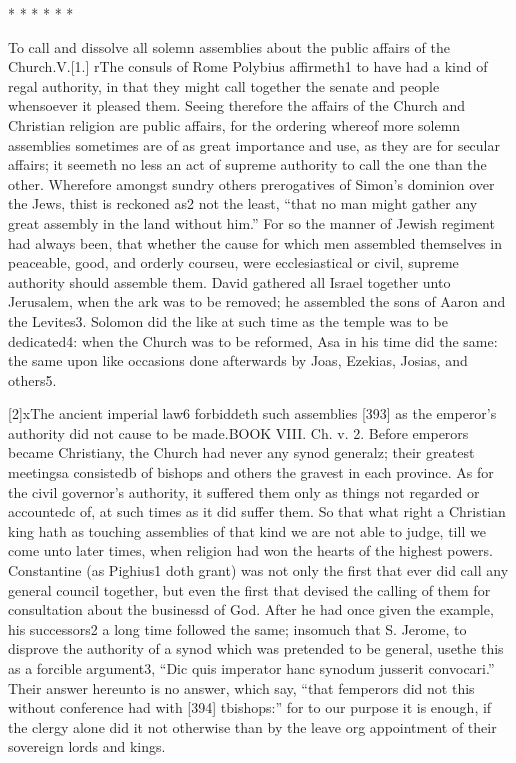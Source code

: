 * * * * * *

To call and dissolve all solemn assemblies about the public affairs of the Church.V.[1.] rThe consuls of Rome Polybius affirmeth1 to have had a kind of regal authority, in that they might call together the senate and people whensoever it pleased them. Seeing therefore the affairs of the Church and Christian religion are public affairs, for the ordering whereof more solemn assemblies sometimes are of as great importance and use, as they are for secular affairs; it seemeth no less an act of supreme authority to call the one than the other. Wherefore amongst sundry others prerogatives of Simon’s dominion over the Jews, thist is reckoned as2 not the least, “that no man might gather any great assembly in the land without him.” For so the manner of Jewish regiment had always been, that whether the cause for which men assembled themselves in peaceable, good, and orderly courseu, were ecclesiastical or civil, supreme authority should assemble them. David gathered all Israel together unto Jerusalem, when the ark was to be removed; he assembled the sons of Aaron and the Levites3. Solomon did the like at such time as the temple was to be dedicated4: when the Church was to be reformed, Asa in his time did the same: the same upon like occasions done afterwards by Joas, Ezekias, Josias, and others5.

[2]xThe ancient imperial law6 forbiddeth such assemblies [393] as the emperor’s authority did not cause to be made.BOOK VIII. Ch. v. 2. Before emperors became Christiany, the Church had never any synod generalz; their greatest meetingsa consistedb of bishops and others the gravest in each province. As for the civil governor’s authority, it suffered them only as things not regarded or accountedc of, at such times as it did suffer them. So that what right a Christian king hath as touching assemblies of that kind we are not able to judge, till we come unto later times, when religion had won the hearts of the highest powers. Constantine (as Pighius1 doth grant) was not only the first that ever did call any general council together, but even the first that devised the calling of them for consultation about the businessd of God. After he had once given the example, his successors2 a long time followed the same; insomuch that S. Jerome, to disprove the authority of a synod which was pretended to be general, usethe this as a forcible argument3, “Dic quis imperator hanc synodum jusserit convocari.” Their answer hereunto is no answer, which say, “that femperors did not this without conference had with [394] tbishops:” for to our purpose it is enough, if the clergy alone did it not otherwise than by the leave org appointment of their sovereign lords and kings.

